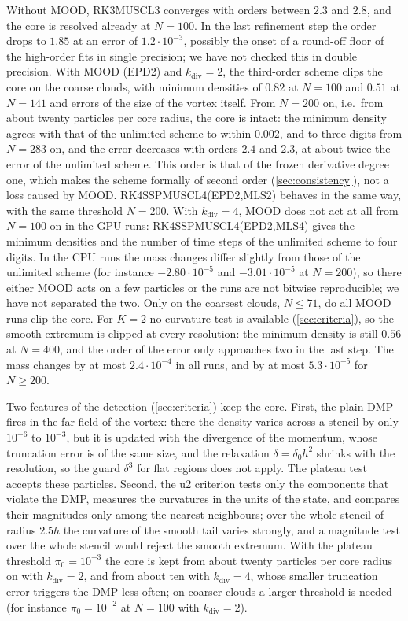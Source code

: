 \documentclass[11pt,a4paper]{article}
\numberwithin{equation}{section}
\begin{document}
Without MOOD, RK3MUSCL3 converges with orders between $2.3$ and $2.8$, and the core is resolved already at $N=100$. In the last refinement step the order drops to $1.85$ at an error of $1.2\cdot10^{-3}$, possibly the onset of a round-off floor of the high-order fits in single precision; we have not checked this in double precision. With MOOD (EPD2) and $k_{\mathrm{div}}=2$, the third-order scheme clips the core on the coarse clouds, with minimum densities of $0.82$ at $N=100$ and $0.51$ at $N=141$ and errors of the size of the vortex itself. From $N=200$ on, i.e.\ from about twenty particles per core radius, the core is intact: the minimum density agrees with that of the unlimited scheme to within $0.002$, and to three digits from $N=283$ on, and the error decreases with orders $2.4$ and $2.3$, at about twice the error of the unlimited scheme. This order is that of the frozen derivative degree one, which makes the scheme formally of second order (\cref{sec:consistency}), not a loss caused by MOOD. RK4SSPMUSCL4(EPD2,MLS2) behaves in the same way, with the same threshold $N=200$. With $k_{\mathrm{div}}=4$, MOOD does not act at all from $N=100$ on in the GPU runs: RK4SSPMUSCL4(EPD2,MLS4) gives the minimum densities and the number of time steps of the unlimited scheme to four digits. In the CPU runs the mass changes differ slightly from those of the unlimited scheme (for instance $-2.80\cdot10^{-5}$ and $-3.01\cdot10^{-5}$ at $N=200$), so there either MOOD acts on a few particles or the runs are not bitwise reproducible; we have not separated the two. Only on the coarsest clouds, $N\le71$, do all MOOD runs clip the core. For $K=2$ no curvature test is available (\cref{sec:criteria}), so the smooth extremum is clipped at every resolution: the minimum density is still $0.56$ at $N=400$, and the order of the error only approaches two in the last step. The mass changes by at most $2.4\cdot10^{-4}$ in all runs, and by at most $5.3\cdot10^{-5}$ for $N\ge200$.

Two features of the detection (\cref{sec:criteria}) keep the core. First, the plain DMP fires in the far field of the vortex: there the density varies across a stencil by only $10^{-6}$ to $10^{-3}$, but it is updated with the divergence of the momentum, whose truncation error is of the same size, and the relaxation $\delta=\delta_0h^2$ shrinks with the resolution, so the guard $\delta^3$ for flat regions does not apply. The plateau test accepts these particles. Second, the u2 criterion tests only the components that violate the DMP, measures the curvatures in the units of the state, and compares their magnitudes only among the nearest neighbours; over the whole stencil of radius $2.5h$ the curvature of the smooth tail varies strongly, and a magnitude test over the whole stencil would reject the smooth extremum. With the plateau threshold $\pi_0=10^{-3}$ the core is kept from about twenty particles per core radius on with $k_{\mathrm{div}}=2$, and from about ten with $k_{\mathrm{div}}=4$, whose smaller truncation error triggers the DMP less often; on coarser clouds a larger threshold is needed (for instance $\pi_0=10^{-2}$ at $N=100$ with $k_{\mathrm{div}}=2$).
\end{document}
